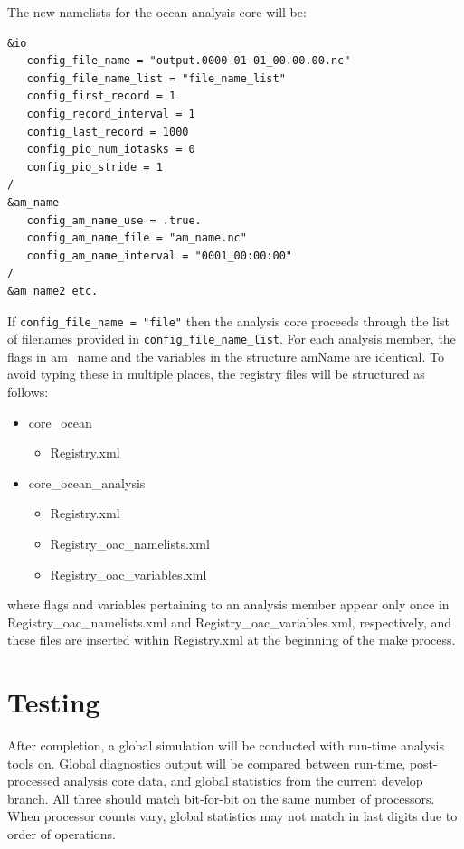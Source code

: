 \documentclass[11pt]{report}
\begin{document}
The new namelists for the ocean analysis core will be:
\begin{verbatim}
&io
   config_file_name = "output.0000-01-01_00.00.00.nc"
   config_file_name_list = "file_name_list"
   config_first_record = 1
   config_record_interval = 1
   config_last_record = 1000
   config_pio_num_iotasks = 0
   config_pio_stride = 1
/
&am_name
   config_am_name_use = .true.
   config_am_name_file = "am_name.nc"
   config_am_name_interval = "0001_00:00:00"
/
&am_name2 etc.
\end{verbatim}
If \verb|config_file_name = "file"| then the analysis core proceeds through the list of filenames provided in 
\verb|config_file_name_list|.  For each analysis member, the flags in am\_name and the variables in the structure amName are identical.  To avoid typing these in multiple places, the registry files will be structured as follows:
\begin{itemize}
\item core\_ocean
\begin{itemize}
\item Registry.xml  
\end{itemize}
\item core\_ocean\_analysis
\begin{itemize}
\item Registry.xml  
\item Registry\_oac\_namelists.xml  
\item Registry\_oac\_variables.xml  
\end{itemize}
\end{itemize}
where flags and variables pertaining to an analysis member appear only once in Registry\_oac\_namelists.xml and  Registry\_oac\_variables.xml, respectively, and these files are inserted within Registry.xml at the beginning of the make process.




\chapter{Testing}

After completion, a global simulation will be conducted with run-time analysis tools on.  Global diagnostics output will be compared between run-time, post-processed analysis core data, and global statistics from the current develop branch.  All three should match bit-for-bit on the same number of processors.  When processor counts vary, global statistics may not match in last digits due to order of operations.



\end{document}
